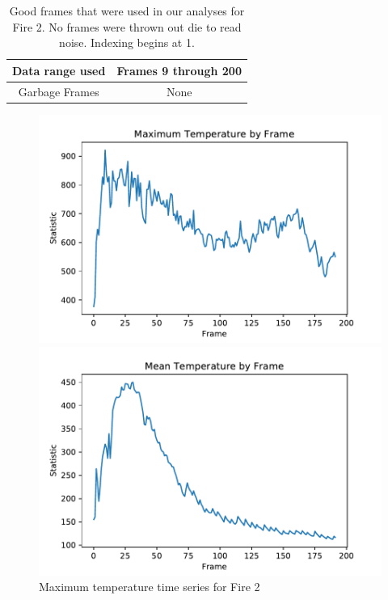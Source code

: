 \documentclass{article}
\begin{document}
\begin{table}
\centering
\begin{tabular}{|c|c|}
\hline
Data range used & Frames 9 through 200 \\
\hline 
Garbage Frames & None \\
\hline
\end{tabular} 


\caption{Good frames that were used in our analyses for Fire 2. No frames were thrown out die to read noise. Indexing begins at 1.}
\end{table}

\begin{figure}[ht] 
\centering
  \label{ fig7} 
  \begin{minipage}[b]{0.5\linewidth}
    \centering
    \includegraphics[width=1.1\linewidth]{../plots/f2_maxtemp.pdf} 
    \caption{Maximum temperature time series for Fire 2} 
    \vspace{4ex}
  \end{minipage}%
  \begin{minipage}[b]{0.5\linewidth}
    \centering
    \includegraphics[width=1.1\linewidth]{../plots/f2_meantemp.pdf} 

\end{minipage}
\end{figure}
\end{document}
